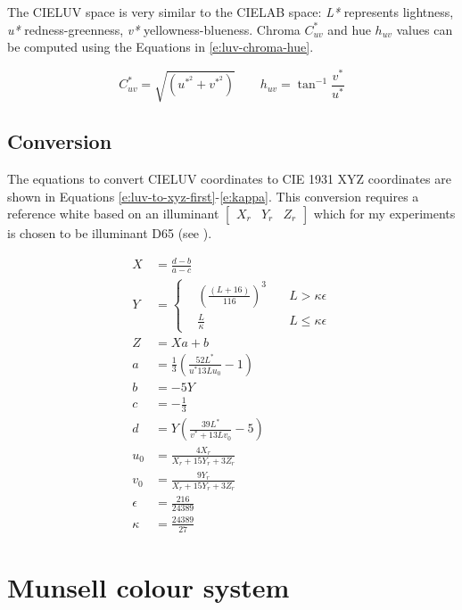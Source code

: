 The CIELUV space is very similar to the CIELAB space: \emph{L*}
represents lightness, \emph{u*} redness-greenness, \emph{v*}
yellowness-blueness. Chroma $C^*_{uv}$ and hue $h_{uv}$ values can be
computed using the Equations in \ref{e:luv-chroma-hue}.

\begin{equation}
C^*_{uv} = \sqrt{\left(u^{*^2} + v^{*^2} \right)} \qquad h_{uv} = \tan^{-1} \frac{v^*}{u^*}
\label{e:luv-chroma-hue}
\end{equation}

\subsection*{Conversion}

The equations to convert CIELUV coordinates to CIE 1931 XYZ
coordinates are shown in Equations
\ref{e:luv-to-xyz-first}-\ref{e:kappa}. This conversion requires a
reference white based on an illuminant $\begin{bmatrix}X_r & Y_r &
  Z_r\end{bmatrix}$ which for my experiments is chosen to be
illuminant D65 (see ).

\begin{align}
X& = \frac{d - b}{a - c} 
\label{e:luv-to-xyz-first} \\
Y& = 
\left\{
\begin{aligned}
&\left(\frac{(L + 16)}{116}\right)^3& \quad L > \kappa\epsilon \\
&\frac{L}{\kappa}& \quad L \leq \kappa\epsilon
\end{aligned} 
\right. \\
Z& = Xa + b \\
a& = \frac{1}{3}\left(\frac{52L^{*}}{u^{*}13Lu_0}-1\right) \\
b& = -5Y  \\
c& = -\frac{1}{3} \\
d& = Y \left(\frac{39L^{*}}{v^{*}+13Lv_0} - 5\right) \\
u_0& = \frac{4X_r}{X_r + 15Y_r + 3 Z_r}  \\
v_0& = \frac{9Y_r}{X_r + 15Y_r + 3 Z_r}  \\
\epsilon& = \frac{216}{24389} 
\label{e:epsilon} \\
\kappa& = \frac{24389}{27}
\label{e:kappa}
\end{align}

\section{Munsell colour system}
\label{s:munsell}


